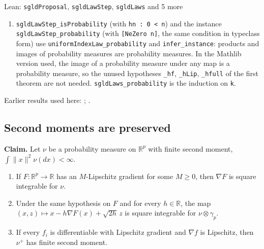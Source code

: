 \documentclass[11pt,a4paper]{report}
\begin{document}
\begin{leanbox}{Lean: \texttt{sgldProposal}, \texttt{sgldLawStep}, \texttt{sgldLaws} and 5 more}
\begin{enumerate}
\item \texttt{sgld\allowbreak{}Law\allowbreak{}Step\_\allowbreak{}is\allowbreak{}Probability} (with \texttt{hn : 0 < n}) and the instance \texttt{sgld\allowbreak{}Law\allowbreak{}Step\_\allowbreak{}probability} (with \texttt{[Ne\allowbreak{}Zero n]}, the same condition in typeclass form) use \texttt{uniform\allowbreak{}Index\allowbreak{}Law\_\allowbreak{}probability} and \texttt{infer\_\allowbreak{}instance}: products and images of probability measures are probability measures. In the Mathlib version used, the image of a probability measure under any map is a probability measure, so the unused hypotheses \texttt{\_\allowbreak{}hf}, \texttt{\_\allowbreak{}h\allowbreak{}Lip}, \texttt{\_\allowbreak{}hfull} of the first theorem are not needed. \texttt{sgld\allowbreak{}Laws\_\allowbreak{}probability} is the induction on \texttt{k}.

\end{enumerate}
\end{leanbox}


Earlier results used here: \cite[Section~3.34.1]{LangevinLean2026ULASC}; \cite[Section~3.36.5]{LangevinLean2026ULASC}.
\subsection{\texorpdfstring{Second moments are preserved}{Second moments are preserved}}
\label{report-step-AverageLMC-SGLDLaw-lean-2}


\textbf{Claim.} Let \(\nu\) be a probability measure on \(\mathbb R^p\) with finite second moment, \(\int\|x\|^2\nu(dx)<\infty\).



\begin{enumerate}


\item If \(F:\mathbb R^p\to\mathbb R\) has an \(M\)-Lipschitz gradient for some \(M\ge0\), then \(\nabla F\) is square integrable for \(\nu\).

\item Under the same hypothesis on \(F\) and for every \(h\in\mathbb R\), the map \((x,z)\mapsto x-h\nabla F(x)+\sqrt{2h}\,z\) is square integrable for \(\nu\otimes\gamma_p\).

\item If every \(f_i\) is differentiable with Lipschitz gradient and \(\nabla f\) is Lipschitz, then \(\nu^+\) has finite second moment.

\end{enumerate}
\end{document}
